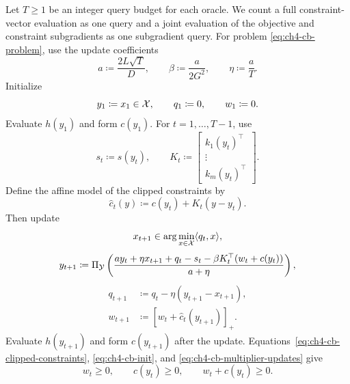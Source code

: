 Let $T\ge1$ be an integer query budget for each oracle. We count a full
constraint-vector evaluation as one query and a joint evaluation of the
objective and constraint subgradients as one subgradient query.
For problem \eqref{eq:ch4-cb-problem}, use the update coefficients
\begin{equation}\label{eq:ch4-cb-tuning}
a\coloneqq\frac{2L\sqrt T}{D},\qquad
\beta\coloneqq\frac{a}{2G^2},\qquad
\eta\coloneqq\frac aT.
\end{equation}
Initialize
\begin{equation}\label{eq:ch4-cb-init}
y_1\coloneqq x_1\in\mathcal{X},\qquad q_1\coloneqq0,\qquad w_1\coloneqq0.
\end{equation}
Evaluate $h(y_1)$ and form $c(y_1)$. For $t=1,\ldots,T-1$, use
\begin{equation}\label{eq:ch4-cb-oracle-data}
s_t\coloneqq s(y_t),\qquad
K_t\coloneqq\begin{bmatrix}k_1(y_t)^\top\\ \vdots\\k_m(y_t)^\top\end{bmatrix}.
\end{equation}
Define the affine model of the clipped constraints by
\begin{equation}\label{eq:ch4-cb-affine-model}
\widehat c_t(y)\coloneqq c(y_t)+K_t(y-y_t).
\end{equation}
Then update
\begin{equation}\label{eq:ch4-cb-linear-oracle}
x_{t+1}\in\arg\min_{x\in\mathcal{X}}\langle q_t,x\rangle,
\end{equation}
\begin{equation}\label{eq:ch4-cb-primal-update}
y_{t+1}\coloneqq\Pi_{\mathcal{Y}}\left(
\frac{a y_t+\eta x_{t+1}+q_t-s_t-\beta K_t^\top(w_t+c(y_t))}{a+\eta}
\right),
\end{equation}
\begin{equation}\label{eq:ch4-cb-multiplier-updates}
\begin{aligned}
q_{t+1}&\coloneqq q_t-\eta(y_{t+1}-x_{t+1}),\\
w_{t+1}&\coloneqq[w_t+\widehat c_t(y_{t+1})]_+.
\end{aligned}
\end{equation}
Evaluate $h(y_{t+1})$ and form $c(y_{t+1})$ after the update.
Equations~\eqref{eq:ch4-cb-clipped-constraints},
\eqref{eq:ch4-cb-init}, and \eqref{eq:ch4-cb-multiplier-updates} give
\begin{equation}\label{eq:ch4-cb-nonnegative-weights}
w_t\ge0,\qquad c(y_t)\ge0,\qquad w_t+c(y_t)\ge0.
\end{equation}

